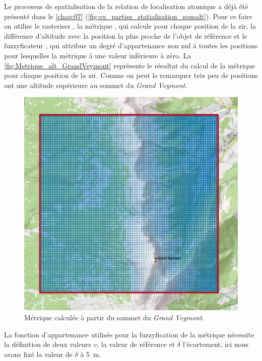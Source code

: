 Le processus de spatialisation de la relation de localisation atomique
 a déjà été présenté dans le
\autoref{chap:07}
(\autoref{fig:ex_parties_statialisation_sousalt}). Pour ce faire on
utilise le rasteriser , la métrique
, qui calcule pour chaque position de
la \ac{zir}, la différence d'altitude avec la position la plus proche
de l'objet de référence et le fuzzyficateur ,
qui attribue un degré d'appartenance non nul à toutes les positions
pour lesquelles la métrique à une valeur inférieure à zéro. La
\autoref{fig:Metrique_alt_GrandVeymont} représente le résultat du
calcul de la métrique pour chaque position de la \ac{zir}. Comme on
peut le remarquer très peu de positions ont une altitude supérieure au
sommet du \emph{Grand Veymont.}

\begin{figure}
  \centering
  \includegraphics{./figures/Metrique_sous_GrandVeymont.png}
  \caption{Métrique \protect{} calculée
    à partir du sommet du \emph{Grand Veymont.}}
  \label{fig:Metrique_alt_GrandVeymont}
\end{figure}

La fonction d'appartenance utilisée pour la fuzzyfication de la
métrique nécessite la définition de deux valeurs \(v\), la valeur de
référence et \(\delta\) l'écartement, ici nous avons fixé la valeur de
\(\delta\) à \SI{5}{\meter}.

